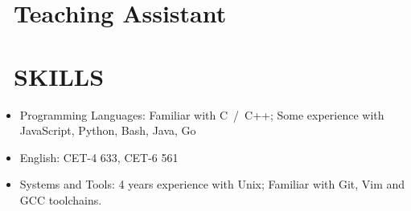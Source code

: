 \documentclass{resume}
\begin{document}
\section{\faBook\ Teaching Assistant}

\section{\faCogs\ SKILLS}
\begin{itemize}[parsep=1.0ex]
  \item Programming Languages: Familiar with C\ /\ C++; Some experience with JavaScript, Python, Bash, Java, Go
  \item English: CET-4 633, CET-6 561
  \item Systems and Tools: 4 years experience with Unix; Familiar with Git, Vim and GCC toolchains.
\end{itemize}
\end{document}
